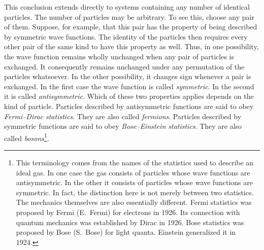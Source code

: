 This conclusion extends directly to systems containing any number of identical particles.
The number of particles may be arbitrary.
To see this, choose any pair of them.
Suppose, for example, that this pair has the property of being described by symmetric wave functions.
The identity of the particles then requires every other pair of the same kind to have this property as well.
Thus, in one possibility, the wave function remains wholly unchanged when any pair of particles is exchanged.
It consequently remains unchanged under any permutation of the particles whatsoever.
In the other possibility, it changes sign whenever a pair is exchanged.
In the first case the wave function is called \emph{symmetric}.
In the second it is called \emph{antisymmetric}.
Which of these two properties applies depends on the kind of particle.
Particles described by antisymmetric functions are said to obey \emph{Fermi--Dirac statistics}.
They are also called \emph{fermions}.
Particles described by symmetric functions are said to obey \emph{Bose--Einstein statistics}.
They are also called \emph{bosons}\footnote{This terminology comes from the names of the statistics used to describe an ideal gas. In one case the gas consists of particles whose wave functions are antisymmetric. In the other it consists of particles whose wave functions are symmetric. In fact, the distinction here is not merely between two statistics. The mechanics themselves are also essentially different. Fermi statistics was proposed by Fermi (E.~Fermi) for electrons in 1926. Its connection with quantum mechanics was established by Dirac in 1926. Bose statistics was proposed by Bose (S.~Bose) for light quanta. Einstein generalized it in 1924.}.
